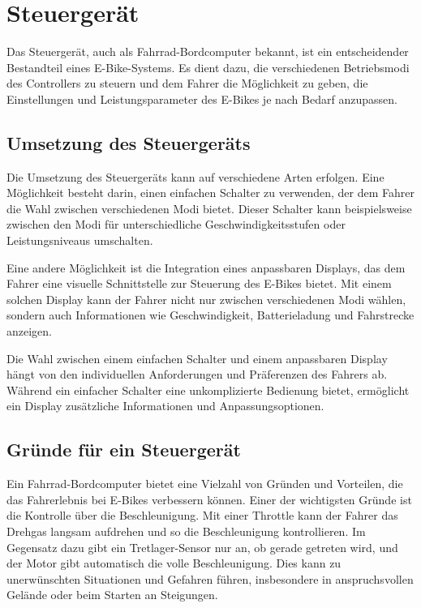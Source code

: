 
\chapter{Steuergerät}

Das Steuergerät, auch als Fahrrad-Bordcomputer bekannt, ist ein entscheidender Bestandteil eines E-Bike-Systems. Es dient dazu, die verschiedenen Betriebsmodi des Controllers zu steuern und dem Fahrer die Möglichkeit zu geben, die Einstellungen und Leistungsparameter des E-Bikes je nach Bedarf anzupassen.

\section{Umsetzung des Steuergeräts}

Die Umsetzung des Steuergeräts kann auf verschiedene Arten erfolgen. Eine Möglichkeit besteht darin, einen einfachen Schalter zu verwenden, der dem Fahrer die Wahl zwischen verschiedenen Modi bietet. Dieser Schalter kann beispielsweise zwischen den Modi für unterschiedliche Geschwindigkeitsstufen oder Leistungsniveaus umschalten.

Eine andere Möglichkeit ist die Integration eines anpassbaren Displays, das dem Fahrer eine visuelle Schnittstelle zur Steuerung des E-Bikes bietet. Mit einem solchen Display kann der Fahrer nicht nur zwischen verschiedenen Modi wählen, sondern auch Informationen wie Geschwindigkeit, Batterieladung und Fahrstrecke anzeigen.

Die Wahl zwischen einem einfachen Schalter und einem anpassbaren Display hängt von den individuellen Anforderungen und Präferenzen des Fahrers ab. Während ein einfacher Schalter eine unkomplizierte Bedienung bietet, ermöglicht ein Display zusätzliche Informationen und Anpassungsoptionen.

\section{Gründe für ein Steuergerät}

Ein Fahrrad-Bordcomputer bietet eine Vielzahl von Gründen und Vorteilen, die das Fahrerlebnis bei E-Bikes verbessern können. Einer der wichtigsten Gründe ist die Kontrolle über die Beschleunigung. Mit einer Throttle kann der Fahrer das Drehgas langsam aufdrehen und so die Beschleunigung kontrollieren. Im Gegensatz dazu gibt ein Tretlager-Sensor nur an, ob gerade getreten wird, und der Motor gibt automatisch die volle Beschleunigung. Dies kann zu unerwünschten Situationen und Gefahren führen, insbesondere in anspruchsvollen Gelände oder beim Starten an Steigungen.

